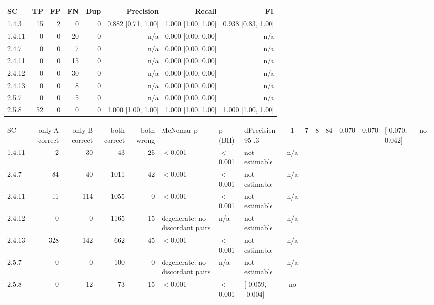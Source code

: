 \begin{tabular}{lrrrrrrr}
\hline
SC & TP & FP & FN & Dup & Precision & Recall & F1 \\
\hline
1.4.3 & 15 & 2 & 0 & 0 & 0.882 [0.71, 1.00] & 1.000 [1.00, 1.00] & 0.938 [0.83, 1.00] \\
1.4.11 & 0 & 0 & 20 & 0 & n/a & 0.000 [0.00, 0.00] & n/a \\
2.4.7 & 0 & 0 & 7 & 0 & n/a & 0.000 [0.00, 0.00] & n/a \\
2.4.11 & 0 & 0 & 15 & 0 & n/a & 0.000 [0.00, 0.00] & n/a \\
2.4.12 & 0 & 0 & 30 & 0 & n/a & 0.000 [0.00, 0.00] & n/a \\
2.4.13 & 0 & 0 & 8 & 0 & n/a & 0.000 [0.00, 0.00] & n/a \\
2.5.7 & 0 & 0 & 5 & 0 & n/a & 0.000 [0.00, 0.00] & n/a \\
2.5.8 & 52 & 0 & 0 & 0 & 1.000 [1.00, 1.00] & 1.000 [1.00, 1.00] & 1.000 [1.00, 1.00] \\
\hline
\end{tabular}

\begin{tabular}{lrrrrlllc}
\hline
SC & only A correct & only B correct & both correct & both wrong & McNemar p & p (BH) & dPrecision 95%
.3 & 1 & 7 & 8 & 84 & 0.070 & 0.070 & [-0.070, 0.042] & no \\
1.4.11 & 2 & 30 & 43 & 25 & $<$0.001 & $<$0.001 & not estimable & n/a \\
2.4.7 & 84 & 40 & 1011 & 42 & $<$0.001 & $<$0.001 & not estimable & n/a \\
2.4.11 & 11 & 114 & 1055 & 0 & $<$0.001 & $<$0.001 & not estimable & n/a \\
2.4.12 & 0 & 0 & 1165 & 15 & degenerate: no discordant pairs & n/a & not estimable & n/a \\
2.4.13 & 328 & 142 & 662 & 45 & $<$0.001 & $<$0.001 & not estimable & n/a \\
2.5.7 & 0 & 0 & 100 & 0 & degenerate: no discordant pairs & n/a & not estimable & n/a \\
2.5.8 & 0 & 12 & 73 & 15 & $<$0.001 & $<$0.001 & [-0.059, -0.004] & no \\
\hline
\end{tabular}

